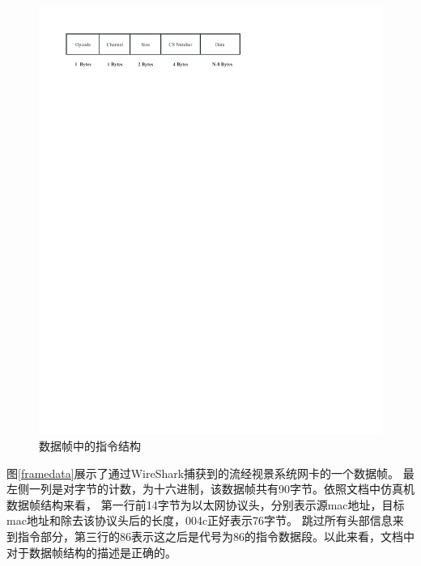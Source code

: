 \begin{figure}[h!]
    \begin{center}
        \includegraphics[width=.8\textwidth]{pictures/commStruct.pdf}
        \caption{数据帧中的指令结构}
        \label{commstruct}
    \end{center}
\end{figure}
\par
图\ref{framedata}展示了通过WireShark捕获到的流经视景系统网卡的一个数据帧。
最左侧一列是对字节的计数，为十六进制，该数据帧共有90字节。依照文档中仿真机数据帧结构来看，
第一行前14字节为以太网协议头，分别表示源mac地址，目标mac地址和除去该协议头后的长度，004c正好表示76字节。
跳过所有头部信息来到指令部分，第三行的86表示这之后是代号为86的指令数据段。以此来看，文档中对于数据帧结构的描述是正确的。
